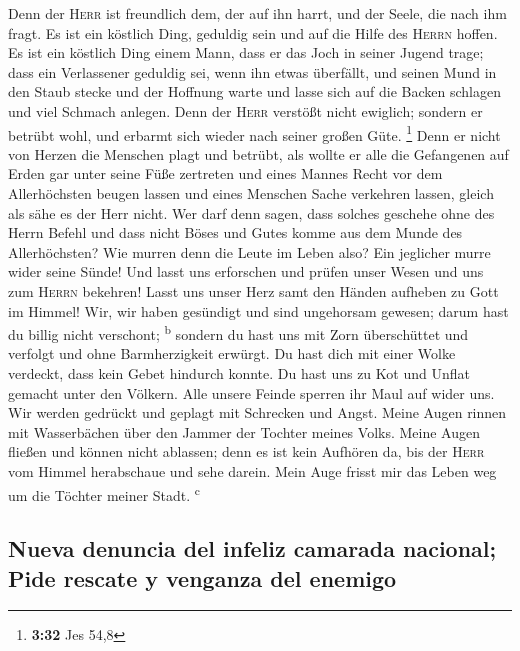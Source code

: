  Denn der \textsc{Herr} ist freundlich dem, der auf ihn
harrt, und der Seele, die nach ihm fragt.  Es ist ein
köstlich Ding, geduldig sein und auf die Hilfe des \textsc{Herrn}
hoffen.  Es ist ein köstlich Ding einem Mann, dass er das
Joch in seiner Jugend trage;  dass ein Verlassener
geduldig sei, wenn ihn etwas überfällt,  und seinen Mund
in den Staub stecke und der Hoffnung warte  und lasse
sich auf die Backen schlagen und viel Schmach anlegen. 
Denn der \textsc{Herr} verstößt nicht ewiglich;  sondern
er betrübt wohl, und erbarmt sich wieder nach seiner großen Güte.
\footnote{\textbf{3:32} Jes 54,8}  Denn er nicht von
Herzen die Menschen plagt und betrübt,  als wollte er
alle die Gefangenen auf Erden gar unter seine Füße zertreten
 und eines Mannes Recht vor dem Allerhöchsten beugen
lassen  und eines Menschen Sache verkehren lassen, gleich
als sähe es der Herr nicht.  Wer darf denn sagen, dass
solches geschehe ohne des Herrn Befehl  und dass nicht
Böses und Gutes komme aus dem Munde des Allerhöchsten? 
Wie murren denn die Leute im Leben also? Ein jeglicher murre wider seine
Sünde!  Und lasst uns erforschen und prüfen unser Wesen
und uns zum \textsc{Herrn} bekehren!  Lasst uns unser
Herz samt den Händen aufheben zu Gott im Himmel!  Wir,
wir haben gesündigt und sind ungehorsam gewesen; darum hast du billig
nicht verschont; \textsuperscript{b}  sondern du hast uns
mit Zorn überschüttet und verfolgt und ohne Barmherzigkeit erwürgt.
 Du hast dich mit einer Wolke verdeckt, dass kein Gebet
hindurch konnte.  Du hast uns zu Kot und Unflat gemacht
unter den Völkern.  Alle unsere Feinde sperren ihr Maul
auf wider uns.  Wir werden gedrückt und geplagt mit
Schrecken und Angst.  Meine Augen rinnen mit Wasserbächen
über den Jammer der Tochter meines Volks.  Meine Augen
fließen und können nicht ablassen; denn es ist kein Aufhören da,
 bis der \textsc{Herr} vom Himmel herabschaue und sehe
darein.  Mein Auge frisst mir das Leben weg um die
Töchter meiner Stadt. \textsuperscript{c}

\hypertarget{nueva-denuncia-del-infeliz-camarada-nacional-pide-rescate-y-venganza-del-enemigo}{%
\subsection{Nueva denuncia del infeliz camarada nacional; Pide rescate y
venganza del
enemigo}\label{nueva-denuncia-del-infeliz-camarada-nacional-pide-rescate-y-venganza-del-enemigo}}

